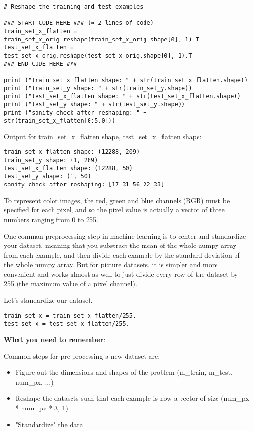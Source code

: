 {{\begin{verbatim}
# Reshape the training and test examples

### START CODE HERE ### (≈ 2 lines of code)
train_set_x_flatten = train_set_x_orig.reshape(train_set_x_orig.shape[0],-1).T
test_set_x_flatten = test_set_x_orig.reshape(test_set_x_orig.shape[0],-1).T
### END CODE HERE ###

print ("train_set_x_flatten shape: " + str(train_set_x_flatten.shape))
print ("train_set_y shape: " + str(train_set_y.shape))
print ("test_set_x_flatten shape: " + str(test_set_x_flatten.shape))
print ("test_set_y shape: " + str(test_set_y.shape))
print ("sanity check after reshaping: " + str(train_set_x_flatten[0:5,0]))
\end{verbatim}

Output for train\_set\_x\_flatten shape, test\_set\_x\_flatten shape:
\begin{verbatim}
train_set_x_flatten shape: (12288, 209)
train_set_y shape: (1, 209)
test_set_x_flatten shape: (12288, 50)
test_set_y shape: (1, 50)
sanity check after reshaping: [17 31 56 22 33]
\end{verbatim}

To represent color images, the red, green and blue channels (RGB) must be specified for each pixel, and so the pixel value is actually a vector of three numbers ranging from 0 to 255.

One common preprocessing step in machine learning is to center and standardize your dataset, meaning that you substract the mean of the whole numpy array from each example, and then divide each example by the standard deviation of the whole numpy array. But for picture datasets, it is simpler and more convenient and works almost as well to just divide every row of the dataset by 255 (the maximum value of a pixel channel).

Let's standardize our dataset.

\begin{verbatim}
train_set_x = train_set_x_flatten/255.
test_set_x = test_set_x_flatten/255.
\end{verbatim}

{\color{blue}
{\textbf {What you need to remember}}:
 
Common steps for pre-processing a new dataset are:
\begin{itemize}
\item Figure out the dimensions and shapes of the problem (m\_train, m\_test, num\_px, ...)
\item Reshape the datasets such that each example is now a vector of size (num\_px * num\_px * 3, 1)
\item "Standardize" the data
\end{itemize}
}




}}
